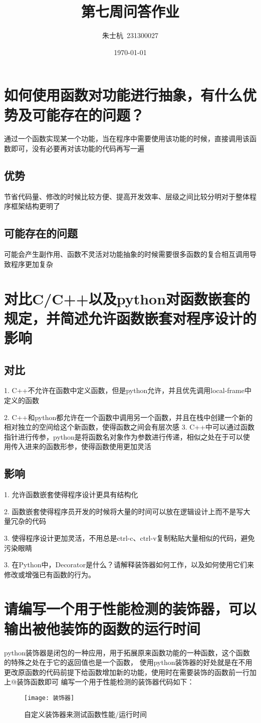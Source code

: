 \documentclass[10pt]{article}
\title{第七周问答作业}
\author{朱士杭\ 231300027}
\date{\kaishu \today}
\begin{document}
	\maketitle
	\section{如何使用函数对功能进行抽象，有什么优势及可能存在的问题？}
	通过一个函数实现某一个功能，当在程序中需要使用该功能的时候，直接调用该函数即可，没有必要再对该功能的代码再写一遍\par
	\subsection{优势}节省代码量、修改的时候比较方便、提高开发效率、层级之间比较分明对于整体程序框架结构更明了
	\subsection{可能存在的问题}可能会产生副作用、函数不灵活对功能抽象的时候需要很多函数的复合相互调用导致程序更加复杂
	\section{对比C/C++以及python对函数嵌套的规定，并简述允许函数嵌套对程序设计的影响}
	\subsection{对比}
	1. C++不允许在函数中定义函数，但是python允许，并且优先调用local-frame中定义的函数\par
	2. C++和python都允许在一个函数中调用另一个函数，并且在栈中创建一个新的相对独立的空间给这个新函数，使得函数之间会有层次感
	3. C++中可以通过函数指针进行传参，python是将函数名对象作为参数进行传递，相似之处在于可以使用传入进来的函数形参，使得函数使用更加灵活\par
	\subsection{影响}
	1. 允许函数嵌套使得程序设计更具有结构化\par
	2. 函数嵌套使得程序员开发的时候将大量的时间可以放在逻辑设计上而不是写大量冗杂的代码\par
	3. 使得程序设计更加灵活，不用总是ctrl-c、ctrl-v复制粘贴大量相似的代码，避免污染眼睛\par
	3. 在Python中，Decorator是什么？请解释装饰器如何工作，以及如何使用它们来修改或增强已有函数的行为。
	\section{请编写一个用于性能检测的装饰器，可以输出被他装饰的函数的运行时间}
	python装饰器是闭包的一种应用，用于拓展原来函数功能的一种函数，这个函数的特殊之处在于它的返回值也是一个函数，
	使用python装饰器的好处就是在不用更改原函数的代码前提下给函数增加新的功能，使用时在需要装饰的函数前一行加上@装饰函数即可
	编写一个用于性能检测的装饰器代码如下：\par
	\begin{figure}[H]
		\centering
		\texttt{[image: 装饰器]}
		\caption{自定义装饰器来测试函数性能/运行时间}
	\end{figure}
\end{document}
